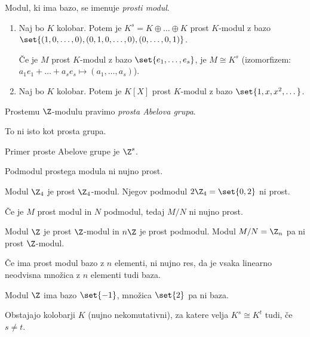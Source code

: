 \begin{definicija}
    Modul, ki ima bazo, se imenuje \emph{prosti modul}.
\end{definicija}

\begin{primer}
    \begin{enumerate}
        \item Naj bo $K$ kolobar. Potem je $K^s = K \oplus \dots \oplus K$ prost $K$-modul 
        z bazo $\set{(1,0,\dots,0), (0, 1, 0, \dots, 0), (0,\dots,0,1)}$. 

        Če je $M$ prost $K$-modul z bazo $\set{e_1, \dots, e_s}$, je $M \cong K^s$ 
        (izomorfizem: $a_1e_1 + \dots + a_se_s \mapsto (a_1, \dots, a_s)$).

        \item Naj bo $K$ kolobar. Potem je $K[X]$ prost $K$-modul z bazo $\set{1, x, x^2, \dots}$.
    \end{enumerate}
\end{primer}

\begin{definicija}
    Prostemu $\Z$-modulu pravimo \emph{prosta Abelova grupa}.
\end{definicija}

\begin{opomba}
    To ni isto kot prosta grupa.
\end{opomba}

\begin{primer}
    Primer proste Abelove grupe je $\Z^s$.
\end{primer}

\begin{opomba}
    Podmodul prostega modula ni nujno prost.
\end{opomba}

\begin{primer}
    Modul $\Z_4$ je prost $\Z_4$-modul. Njegov podmodul $2\Z_4 = \set{0, 2}$ ni prost.
\end{primer}

\begin{opomba}
    Če je $M$ prost modul in $N$ podmodul, tedaj $M/N$ ni nujno prost.
\end{opomba}

\begin{primer}
    Modul $\Z$ je prost $\Z$-modul in $n\Z$ je prost podmodul. Modul $M/N = \Z_n$ pa ni prost 
    $\Z$-modul.
\end{primer}

\begin{opomba}
    Če ima prost modul bazo z $n$ elementi, ni nujno res, da je vsaka linearno neodvisna 
    množica z $n$ elementi tudi baza.
\end{opomba}

\begin{primer}
    Modul $\Z$ ima bazo $\set{-1}$, množica $\set{2}$ pa ni baza.
\end{primer}

\begin{opomba}
    Obstajajo kolobarji $K$ (nujno nekomutativni), za katere velja $K^s \cong K^t$ tudi, če
    $s \neq t$.
\end{opomba}

